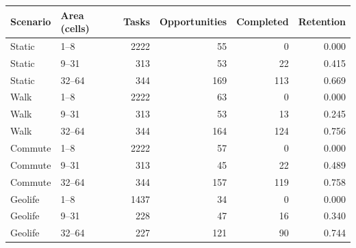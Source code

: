 \begin{tabular}{llrrrr}
\toprule
Scenario & Area (cells) & Tasks & Opportunities & Completed & Retention \\
\midrule
Static & 1--8 & 2222 & 55 & 0 & 0.000 \\
Static & 9--31 & 313 & 53 & 22 & 0.415 \\
Static & 32--64 & 344 & 169 & 113 & 0.669 \\
Walk & 1--8 & 2222 & 63 & 0 & 0.000 \\
Walk & 9--31 & 313 & 53 & 13 & 0.245 \\
Walk & 32--64 & 344 & 164 & 124 & 0.756 \\
Commute & 1--8 & 2222 & 57 & 0 & 0.000 \\
Commute & 9--31 & 313 & 45 & 22 & 0.489 \\
Commute & 32--64 & 344 & 157 & 119 & 0.758 \\
Geolife & 1--8 & 1437 & 34 & 0 & 0.000 \\
Geolife & 9--31 & 228 & 47 & 16 & 0.340 \\
Geolife & 32--64 & 227 & 121 & 90 & 0.744 \\
\bottomrule
\end{tabular}
